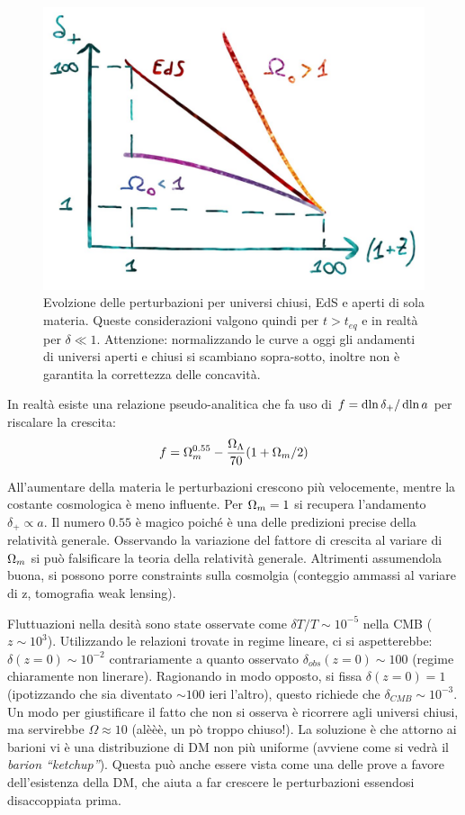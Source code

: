 \begin{figure}[H]
    \centering
    \includegraphics[width=.6 \textwidth]{Pictures/6/crescitapertmat.jpg}
    \caption{Evolzione delle perturbazioni per universi chiusi, EdS e aperti di sola materia. Queste considerazioni valgono quindi per $t>t_{eq}$ e in realtà per $\delta \ll 1$. Attenzione: normalizzando le curve a oggi gli andamenti di universi aperti e chiusi si scambiano sopra-sotto, inoltre non è garantita la correttezza delle concavità. }
\end{figure}

In realtà esiste una relazione pseudo-analitica che fa uso di $f=\operatorname{d}\!{\ln \delta_+} / \operatorname{d}\!{\ln a}$ per riscalare la crescita:
\begin{equation*}
    f=\Omega_{m}^{0.55} - \frac{\Omega_\Lambda}{70} (1+\Omega_{m} /2)
\end{equation*}

All'aumentare della materia le perturbazioni crescono più velocemente, mentre la costante cosmologica è meno influente. Per $\Omega_{m}=1$ si recupera l'andamento $\delta_+ \propto a$. Il numero $0.55$ è magico poiché è una delle predizioni precise della relatività generale. Osservando la variazione del fattore di crescita al variare di $\Omega_{m}$ si può falsificare la teoria della relatività generale. Altrimenti assumendola buona, si possono porre constraints sulla cosmolgia (conteggio ammassi al variare di z, tomografia weak lensing).

\vspace{1em}
Fluttuazioni nella desità sono state osservate come $\delta T /T \sim 10^{-5}$ nella CMB ($z\sim 10^3$). Utilizzando le relazioni trovate in regime lineare, ci si aspetterebbe: $\delta (z=0) \sim 10^{-2}$ contrariamente a quanto osservato $\delta_{obs} (z=0)\sim 100$ (regime chiaramente non linerare). Ragionando in modo opposto, si fissa $\delta (z=0) = 1 $ (ipotizzando che sia diventato $\sim 100$ ieri l'altro), questo richiede che $\delta_{CMB}\sim 10^{-3}$. Un modo per giustificare il fatto che non si osserva è ricorrere agli universi chiusi, ma servirebbe $\Omega \approx 10$ (alèèè, un pò troppo chiuso!). La soluzione è che attorno ai barioni vi è una distribuzione di DM non più uniforme (avviene come si vedrà il \textit{barion ``ketchup''}). Questa può anche essere vista come una delle prove a favore dell'esistenza della DM, che aiuta a far crescere le perturbazioni essendosi disaccoppiata prima.
\vspace{1em}


